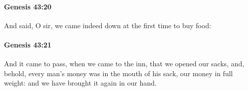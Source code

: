 		\paragraph{Genesis 43:20} %
			\label{GENESIS-43-20}

			And said, O sir, we came indeed down at the first time to buy food:


		\paragraph{Genesis 43:21} %
			\label{GENESIS-43-21}

			And it came to pass, when we came to the inn, that we opened our sacks, and, behold, every man's money was in the mouth of his sack, our money in full weight: and we have brought it again in our hand.


